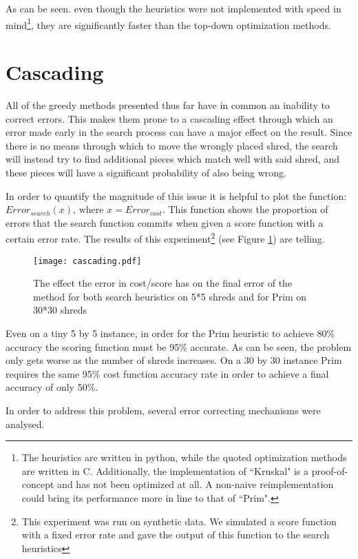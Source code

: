 As can be seen. even though the heuristics were not implemented with speed in mind\footnote{The heuristics are written in python, while the quoted optimization methods are written in C. Additionally, the implementation of ``Kruskal" is a proof-of-concept and has not been optimized at all. A non-naive reimplementation could bring its performance more in line to that of ``Prim".}, they are significantly faster than the top-down optimization methods.

\section{Cascading}
\label{chap5Casc}
All of the greedy methods presented thus far have in common an inability to correct errors. This makes them prone to a cascading effect through which an error made early in the search process can have a major effect on the result. Since there is no means through which to move the wrongly placed shred, the search will instead try to find additional pieces which match well with said shred, and these pieces will have a significant probability of also being wrong. 

In order to quantify the magnitude of this issue it is helpful to plot the function: $Error_{search}(x)$, where $x = Error_{cost}$. This function shows the proportion of errors that the search function commits when given a score function with a certain error rate. The results of this experiment\footnote{This experiment was run on synthetic data. We simulated a score function with a fixed error rate and gave the output of this function to the search heuristics} (see Figure \ref{fig:cascading}) are telling.

\begin{figure}[h]
  \centering
  \texttt{[image: cascading.pdf]}
  \caption{The effect the error in cost/score has on the final error of the method for both search heuristics on 5*5 shreds and for Prim on 30*30 shreds }
  \label{fig:cascading}
\end{figure}

Even on a tiny 5 by 5 instance, in order for the Prim heuristic to achieve 80\% accuracy the scoring function must be 95\% accurate. As can be seen, the problem only gets worse as the number of shreds increases. On a 30 by 30 instance Prim requires the same 95\% cost function accuracy rate in order to achieve a final accuracy of only 50\%.

In order to address this problem, several error correcting mechanisms were analysed. 

